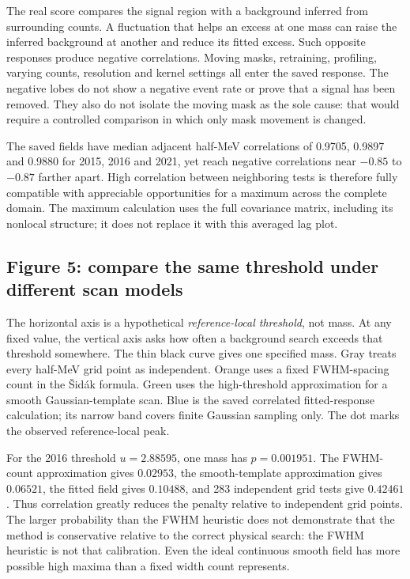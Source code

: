The real score compares the signal region with a background inferred from surrounding counts. A fluctuation that helps an excess at one mass can raise the inferred background at another and reduce its fitted excess. Such opposite responses produce negative correlations. Moving masks, retraining, profiling, varying counts, resolution and kernel settings all enter the saved response. The negative lobes do not show a negative event rate or prove that a signal has been removed. They also do not isolate the moving mask as the sole cause: that would require a controlled comparison in which only mask movement is changed.

The saved fields have median adjacent half-MeV correlations of 0.9705, 0.9897 and 0.9880 for 2015, 2016 and 2021, yet reach negative correlations near $-0.85$ to $-0.87$ farther apart. High correlation between neighboring tests is therefore fully compatible with appreciable opportunities for a maximum across the complete domain. The maximum calculation uses the full covariance matrix, including its nonlocal structure; it does not replace it with this averaged lag plot.

\subsection{Figure 5: compare the same threshold under different scan models}
The horizontal axis is a hypothetical \emph{reference-local threshold}, not mass. At any fixed value, the vertical axis asks how often a background search exceeds that threshold somewhere. The thin black curve gives one specified mass. Gray treats every half-MeV grid point as independent. Orange uses a fixed FWHM-spacing count in the \v{S}id\'ak formula. Green uses the high-threshold approximation for a smooth Gaussian-template scan. Blue is the saved correlated fitted-response calculation; its narrow band covers finite Gaussian sampling only. The dot marks the observed reference-local peak.


For the 2016 threshold $u=2.88595$, one mass has $p=0.001951$. The FWHM-count approximation gives $0.02953$, the smooth-template approximation gives $0.06521$, the fitted field gives $0.10488$, and 283 independent grid tests give $0.42461$. Thus correlation greatly reduces the penalty relative to independent grid points. The larger probability than the FWHM heuristic does not demonstrate that the method is conservative relative to the correct physical search: the FWHM heuristic is not that calibration. Even the ideal continuous smooth field has more possible high maxima than a fixed width count represents.

